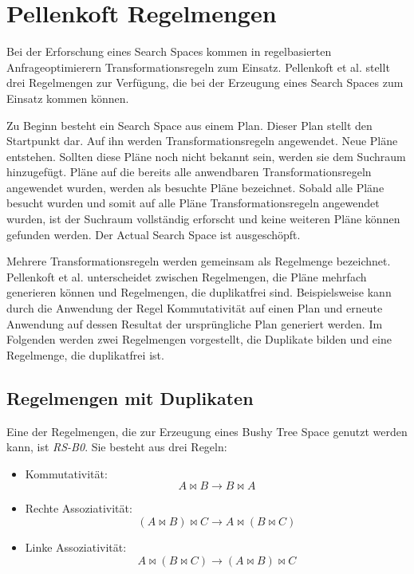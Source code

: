 \section{Pellenkoft Regelmengen}
\label{sec:pellenkoftRulesets}
Bei der Erforschung eines Search Spaces kommen in regelbasierten Anfrageoptimierern Transformationsregeln zum Einsatz. Pellenkoft et al. \cite{pellenkoft1997duplicate} \cite{manegold2000multi} \cite{pellenkoft1997complexity} stellt drei Regelmengen zur Verfügung, die bei der Erzeugung eines Search Spaces zum Einsatz kommen können.



Zu Beginn besteht ein Search Space aus einem Plan. Dieser Plan stellt den Startpunkt dar. Auf ihn werden Transformationsregeln angewendet. Neue Pläne entstehen. Sollten diese Pläne noch nicht bekannt sein, werden sie dem Suchraum hinzugefügt. Pläne auf die bereits alle anwendbaren Transformationsregeln angewendet wurden, werden als besuchte Pläne bezeichnet. Sobald alle Pläne besucht wurden und somit auf alle Pläne Transformationsregeln angewendet wurden, ist der Suchraum vollständig erforscht und keine weiteren Pläne können gefunden werden. Der Actual Search Space ist ausgeschöpft.

Mehrere Transformationsregeln werden gemeinsam als Regelmenge bezeichnet. Pellenkoft et al. unterscheidet zwischen Regelmengen, die Pläne mehrfach generieren können und Regelmengen, die duplikatfrei sind. Beispielsweise kann durch die Anwendung der Regel Kommutativität auf einen Plan und erneute Anwendung auf dessen Resultat  der ursprüngliche Plan generiert werden. Im Folgenden werden zwei Regelmengen vorgestellt, die Duplikate bilden und eine Regelmenge, die duplikatfrei ist.


\subsection{Regelmengen mit Duplikaten}

Eine der Regelmengen, die zur Erzeugung eines Bushy Tree Space genutzt werden kann, ist \textit{RS-B0}. Sie besteht aus drei Regeln:

\begin{itemize}
\item Kommutativität: $$ A \Join B \to B \Join A$$
\item Rechte Assoziativität: $$(A \Join B) \Join C \to A \Join (B \Join C) $$
\item Linke Assoziativität: $$A \Join (B \Join C) \to (A \Join B) \Join C$$
\end{itemize}

